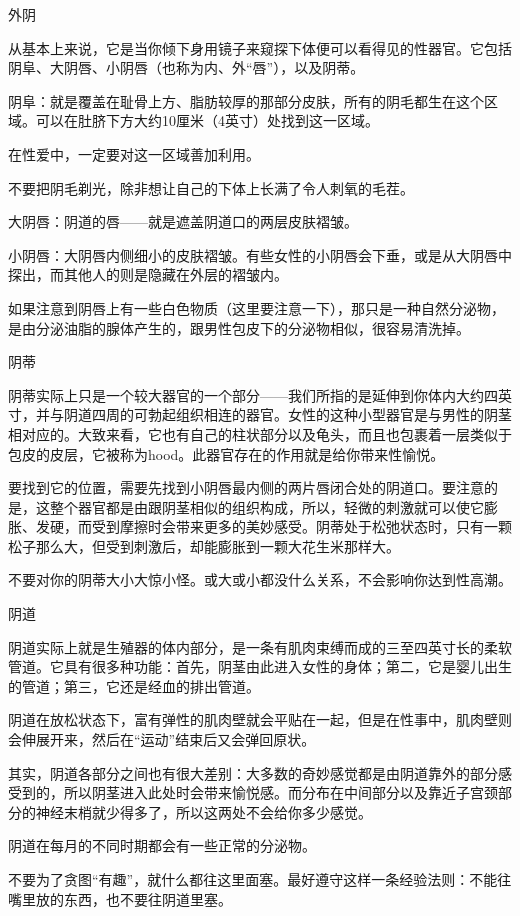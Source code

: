 \documentclass[12pt,UTF8,openany]{ctexbook}
\begin{document}
外阴

从基本上来说，它是当你倾下身用镜子来窥探下体便可以看得见的性器官。它包括阴阜、大阴唇、小阴唇（也称为内、外“唇”），以及阴蒂。

阴阜：就是覆盖在耻骨上方、脂肪较厚的那部分皮肤，所有的阴毛都生在这个区域。可以在肚脐下方大约10厘米（4英寸）处找到这一区域。

在性爱中，一定要对这一区域善加利用。

不要把阴毛剃光，除非想让自己的下体上长满了令人刺氧的毛茬。

大阴唇：阴道的唇——就是遮盖阴道口的两层皮肤褶皱。

小阴唇：大阴唇内侧细小的皮肤褶皱。有些女性的小阴唇会下垂，或是从大阴唇中探出，而其他人的则是隐藏在外层的褶皱内。

如果注意到阴唇上有一些白色物质（这里要注意一下），那只是一种自然分泌物，是由分泌油脂的腺体产生的，跟男性包皮下的分泌物相似，很容易清洗掉。

阴蒂

阴蒂实际上只是一个较大器官的一个部分——我们所指的是延伸到你体内大约四英寸，并与阴道四周的可勃起组织相连的器官。女性的这种小型器官是与男性的阴茎相对应的。大致来看，它也有自己的柱状部分以及龟头，而且也包裹着一层类似于包皮的皮层，它被称为hood。此器官存在的作用就是给你带来性愉悦。

要找到它的位置，需要先找到小阴唇最内侧的两片唇闭合处的阴道口。要注意的是，这整个器官都是由跟阴茎相似的组织构成，所以，轻微的刺激就可以使它膨胀、发硬，而受到摩擦时会带来更多的美妙感受。阴蒂处于松弛状态时，只有一颗松子那么大，但受到刺激后，却能膨胀到一颗大花生米那样大。

不要对你的阴蒂大小大惊小怪。或大或小都没什么关系，不会影响你达到性高潮。

阴道

阴道实际上就是生殖器的体内部分，是一条有肌肉束缚而成的三至四英寸长的柔软管道。它具有很多种功能：首先，阴茎由此进入女性的身体；第二，它是婴儿出生的管道；第三，它还是经血的排出管道。

阴道在放松状态下，富有弹性的肌肉壁就会平贴在一起，但是在性事中，肌肉壁则会伸展开来，然后在“运动”结束后又会弹回原状。

其实，阴道各部分之间也有很大差别：大多数的奇妙感觉都是由阴道靠外的部分感受到的，所以阴茎进入此处时会带来愉悦感。而分布在中间部分以及靠近子宫颈部分的神经末梢就少得多了，所以这两处不会给你多少感觉。

阴道在每月的不同时期都会有一些正常的分泌物。

不要为了贪图“有趣”，就什么都往这里面塞。最好遵守这样一条经验法则：不能往嘴里放的东西，也不要往阴道里塞。
\end{document}
